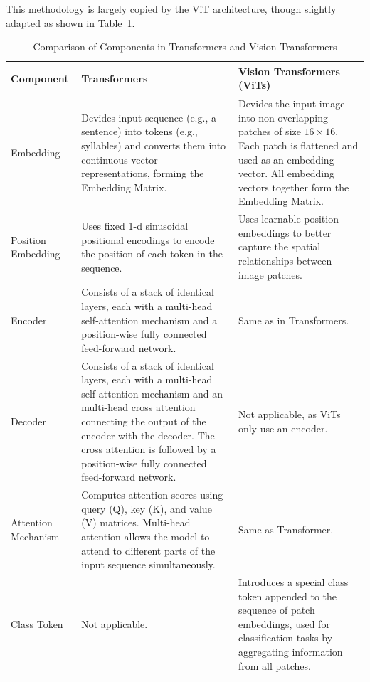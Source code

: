 This methodology is largely copied by the ViT architecture, though slightly adapted as shown in Table~\ref{tab:transformer_vit_comparison}.

\begin{table}[h!]
    \centering
    \begin{tabular}{|p{3cm}|p{5.5cm}|p{5.5cm}|}
    \hline
    \textbf{Component} & \textbf{Transformers} & \textbf{Vision Transformers (ViTs)} \\ \hline
    Embedding & Devides input sequence (e.g., a sentence) into tokens (e.g., syllables) and converts them into continuous vector representations, forming the Embedding Matrix. & Devides the input image into non-overlapping patches of size $16 \times 16$. Each patch is flattened and used as an embedding vector. All embedding vectors together form the Embedding Matrix.\\ \hline
    Position Embedding & Uses fixed 1-d sinusoidal positional encodings to encode the position of each token in the sequence.& Uses learnable position embeddings to better capture the spatial relationships between image patches.\\ \hline
    Encoder & Consists of a stack of identical layers, each with a multi-head self-attention mechanism and a position-wise fully connected feed-forward network. & Same as in Transformers.\\ \hline
    Decoder & Consists of a stack of identical layers, each with a multi-head self-attention mechanism and an multi-head cross attention connecting the output of the encoder with the decoder. The cross attention is followed by a position-wise fully connected feed-forward network. & Not applicable, as ViTs only use an encoder.\\ \hline
    Attention Mechanism & Computes attention scores using query (Q), key (K), and value (V) matrices. Multi-head attention allows the model to attend to different parts of the input sequence simultaneously. &Same as Transformer.\\ \hline
    Class Token & Not applicable. & Introduces a special class token appended to the sequence of patch embeddings, used for classification tasks by aggregating information from all patches.\\ \hline
    \end{tabular}
    \caption{Comparison of Components in Transformers and Vision Transformers}\label{tab:transformer_vit_comparison}
\end{table}

